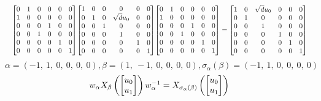 \documentclass[11pt]{article}
\theoremstyle{definition}
\begin{document}
\[
\scaletoalign{\textwidth}{{\left[\begin{matrix}0 & 1 & 0 & 0 & 0 & 0\\1 & 0 & 0 & 0 & 0 & 0\\0 & 0 & 0 & 1 & 0 & 0\\0 & 0 & 1 & 0 & 0 & 0\\0 & 0 & 0 & 0 & 1 & 0\\0 & 0 & 0 & 0 & 0 & 1\end{matrix}\right]} {\left[\begin{matrix}1 & 0 & 0 & 0 & 0 & 0\\0 & 1 & 0 & \sqrt{d} u_{0} & 0 & 0\\0 & 0 & 1 & 0 & 0 & 0\\0 & 0 & 0 & 1 & 0 & 0\\0 & 0 & 0 & 0 & 1 & 0\\0 & 0 & 0 & 0 & 0 & 1\end{matrix}\right]} {\left[\begin{matrix}0 & 1 & 0 & 0 & 0 & 0\\1 & 0 & 0 & 0 & 0 & 0\\0 & 0 & 0 & 1 & 0 & 0\\0 & 0 & 1 & 0 & 0 & 0\\0 & 0 & 0 & 0 & 1 & 0\\0 & 0 & 0 & 0 & 0 & 1\end{matrix}\right]} = {\left[\begin{matrix}1 & 0 & \sqrt{d} u_{0} & 0 & 0 & 0\\0 & 1 & 0 & 0 & 0 & 0\\0 & 0 & 1 & 0 & 0 & 0\\0 & 0 & 0 & 1 & 0 & 0\\0 & 0 & 0 & 0 & 1 & 0\\0 & 0 & 0 & 0 & 0 & 1\end{matrix}\right]}}
\]
\[
\alpha = \left( -1, \  1, \  0, \  0, \  0, \  0\right), \beta = \left( 1, \  -1, \  0, \  0, \  0, \  0\right), \sigma_{\alpha}(\beta) = \left( -1, \  1, \  0, \  0, \  0, \  0\right)
\]
\[
\scaletoalign{\textwidth}{w_{\alpha} X_{\beta}\left(\left[\begin{matrix}u_{0}\\u_{1}\end{matrix}\right]\right) w_{\alpha}^{-1} = X_{\sigma_{\alpha}\left(\beta\right)}\left(\left[\begin{matrix}u_{0}\\u_{1}\end{matrix}\right]\right)}
\]
\end{document}
